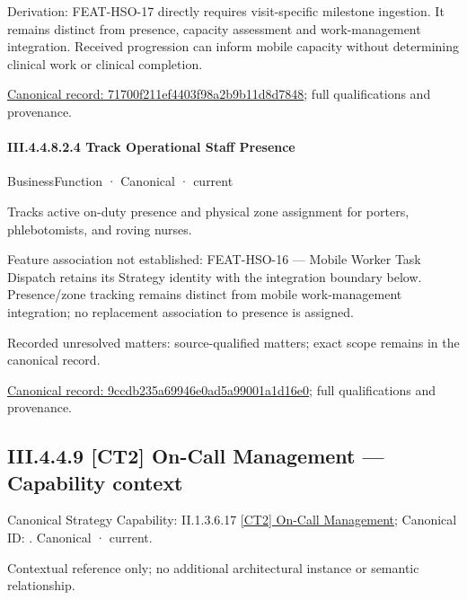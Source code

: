 Derivation: FEAT-HSO-17 directly requires visit-specific milestone ingestion. It remains distinct from presence, capacity assessment and work-management integration. Received progression can inform mobile capacity without determining clinical work or clinical completion.


{\footnotesize \href{../../../../../../../continuum/business/business-function/71700f211ef4403f98a2b9b11d8d7848.md}{Canonical record: 71700f211ef4403f98a2b9b11d8d7848}; full qualifications and provenance.}\par
\paragraph*{III.4.4.8.2.4 Track Operational Staff Presence}
\label{navigation:III.4.4.8.2.4}

\label{element:9ccdb235a69946e0ad5a99001a1d16e0}
{\small BusinessFunction · Canonical · current}\par

Tracks active on-duty presence and physical zone assignment for porters, phlebotomists, and roving nurses.



Feature association not established: FEAT-HSO-16 — Mobile Worker Task Dispatch retains its Strategy identity with the integration boundary below. Presence/zone tracking remains distinct from mobile work-management integration; no replacement association to presence is assigned.


{\small Recorded unresolved matters: source-qualified matters; exact scope remains in the canonical record.}\par
{\footnotesize \href{../../../../../../../continuum/business/business-function/9ccdb235a69946e0ad5a99001a1d16e0.md}{Canonical record: 9ccdb235a69946e0ad5a99001a1d16e0}; full qualifications and provenance.}\par
\subsection*{III.4.4.9 [CT2] On-Call Management — Capability context}
\label{navigation:III.4.4.9}

{\small Canonical Strategy Capability: II.1.3.6.17 \hyperref[element:b16cef8f2bfd4b92948ec75cbcfa7b9a]{[CT2] On-Call Management}; Canonical ID: \texttt{}. Canonical · current.}\par
Contextual reference only; no additional architectural instance or semantic relationship.\par
